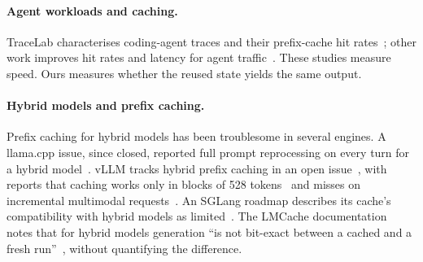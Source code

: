 \paragraph{Agent workloads and caching.}
TraceLab characterises coding-agent traces and their prefix-cache hit
rates~\cite{tracelab}; other work improves hit rates and latency for agent
traffic~\cite{vllm-mooncake,policy-runtime}. These studies measure speed. Ours
measures whether the reused state yields the same output.

\paragraph{Hybrid models and prefix caching.}
Prefix caching for hybrid models has been troublesome in several engines. A
llama.cpp issue, since closed, reported full prompt reprocessing on every turn
for a hybrid model~\cite{llamacpp-20225}. vLLM tracks hybrid prefix caching in
an open issue~\cite{vllm-26201}, with reports that caching works only in
blocks of 528 tokens~\cite{vllm-40696} and misses on incremental multimodal
requests~\cite{vllm-43587}. An SGLang roadmap describes its cache's
compatibility with hybrid models as limited~\cite{sglang-21846}. The LMCache
documentation notes that for hybrid models generation ``is not bit-exact
between a cached and a fresh run''~\cite{lmcache-hybrid}, without quantifying
the difference.
